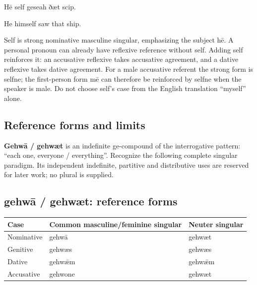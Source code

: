 Hē self geseah ðæt scip.

He himself saw that ship.

Self is strong nominative masculine singular, emphasizing the subject hē. A personal pronoun can already have reflexive reference without self. Adding self reinforces it: an accusative reflexive takes accusative agreement, and a dative reflexive takes dative agreement. For a male accusative referent the strong form is selfne; the first-person form mē can therefore be reinforced by selfne when the speaker is male. Do not choose self’s case from the English translation “myself” alone.

\subsection*{Reference forms and limits}

\textbf{Gehwā /\allowbreak{} gehwæt} is an indefinite ge-compound of the interrogative pattern: “each one, everyone /\allowbreak{} everything”. Recognize the following complete singular paradigm. Its independent indefinite, partitive and distributive uses are reserved for later work; no plural is supplied.

\subsection*{gehwā /\allowbreak{} gehwæt: reference forms}

\par\begingroup
\fontsize{10.5}{13.2}\selectfont
\setlength{\LTleft}{0pt}\setlength{\LTright}{\fill}
\noindent
\begin{tabular}{@{}>{\raggedright\arraybackslash}p{25.54mm}>{\raggedright\arraybackslash}p{64.36mm}>{\raggedright\arraybackslash}p{28.48mm}@{}}
\toprule
\textbf{Case} & \textbf{Common masculine/\allowbreak{}feminine singular} & \textbf{Neuter singular} \\
\midrule
Nominative & gehwā & gehwæt \\
Genitive & gehwæs & gehwæs \\
Dative & gehwǣm & gehwǣm \\
Accusative & gehwone & gehwæt \\
\bottomrule
\end{tabular}
\par\endgroup

